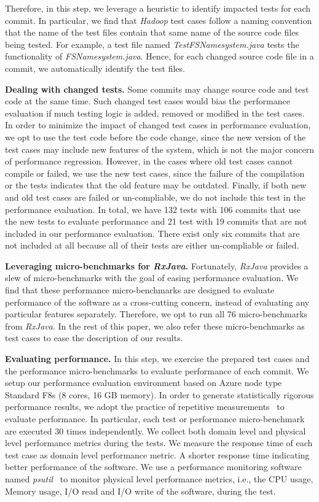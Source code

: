 Therefore, in this step, we leverage a heuristic to identify impacted tests for each commit. In particular, we find that \emph{Hadoop} test cases follow a naming convention that the name of the test files contain that same name of the source code files being tested. For example, a test file named \emph{TestFSNamesystem.java} tests the functionality of \emph{FSNamesystem.java}. Hence, for each changed source code file in a commit, we automatically identify the test files. 

\textbf{Dealing with changed tests.} Some commits may change source code and test code at the same time. Such changed test cases would bias the performance evaluation if much testing logic is added, removed or modified in the test cases. In order to minimize the impact of changed test cases in performance evaluation, we opt to use the test code before the code change, since the new version of the test cases may include new features of the system, which is not the major concern of performance regression. However, in the cases where old test cases cannot compile or failed, we use the new test cases, since the failure of the compilation or the tests indicates that the old feature may be outdated. Finally, if both new and old test cases are failed or un-compliable, we do not include this test in the performance evaluation. In total, we have 132 tests with 106 commits that use the new tests to evaluate performance and 21 test with 19 commits that are not included in our performance evaluation. There exist only six commits that are not included at all because all of their tests are either un-compliable or failed.

\textbf{Leveraging micro-benchmarks for \emph{RxJava}. }Fortunately, \emph{RxJava} provides a slew of micro-benchmarks with the goal of easing performance evaluation. We find that these performance micro-benchmarks are designed to evaluate performance of the software as a cross-cutting concern, instead of evaluating any particular features separately. Therefore, we opt to run all 76 micro-benchmarks from \emph{RxJava}. In the rest of this paper, we also refer these micro-benchmarks as test cases to ease the description of our results.

\textbf{Evaluating performance.}
In this step, we exercise the prepared test cases and the performance micro-benchmarks to evaluate performance of each commit. We setup our performance evaluation environment based on Azure node type Standard F8s (8 cores, 16 GB memory). In order to generate statistically rigorous performance results, we adopt the practice of repetitive measurements~\cite{peterfse} to evaluate performance. 
In particular, each test or performance micro-benchmark are executed 30 times independently. We collect both domain level and physical level performance metrics during the tests. We measure the response time of each test case as domain level performance metric. A shorter response time indicating better performance of the software. We use a performance monitoring software named \emph{psutil}~\cite{psutil} to monitor physical level performance metrics, i.e., the CPU usage, Memory usage, I/O read and I/O write of the software, during the test.

